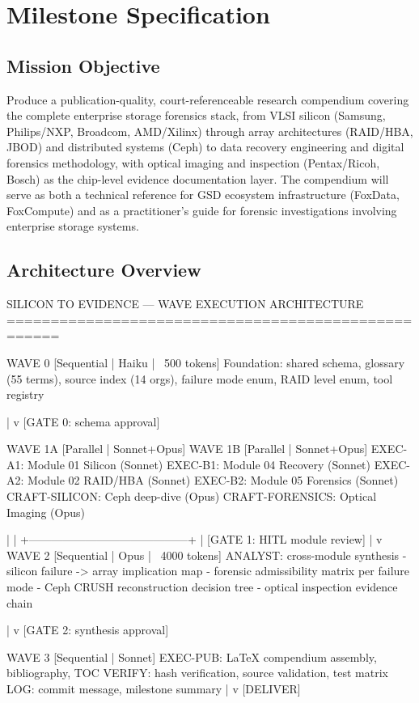 \documentclass[11pt,letterpaper]{article}
\begin{document}
\section{Milestone Specification}

\subsection{Mission Objective}

Produce a publication-quality, court-referenceable research compendium covering the complete enterprise storage forensics stack, from VLSI silicon (Samsung, Philips/NXP, Broadcom, AMD/Xilinx) through array architectures (RAID/HBA, JBOD) and distributed systems (Ceph) to data recovery engineering and digital forensics methodology, with optical imaging and inspection (Pentax/Ricoh, Bosch) as the chip-level evidence documentation layer. The compendium will serve as both a technical reference for GSD ecosystem infrastructure (FoxData, FoxCompute) and as a practitioner's guide for forensic investigations involving enterprise storage systems.

\subsection{Architecture Overview}

\begin{asciibox}
SILICON TO EVIDENCE --- WAVE EXECUTION ARCHITECTURE
====================================================

WAVE 0 [Sequential | Haiku | ~500 tokens]
  Foundation: shared schema, glossary (55 terms), source index (14 orgs),
  failure mode enum, RAID level enum, tool registry

  |
  v [GATE 0: schema approval]

WAVE 1A [Parallel | Sonnet+Opus]          WAVE 1B [Parallel | Sonnet+Opus]
  EXEC-A1: Module 01 Silicon (Sonnet)        EXEC-B1: Module 04 Recovery (Sonnet)
  EXEC-A2: Module 02 RAID/HBA (Sonnet)       EXEC-B2: Module 05 Forensics (Sonnet)
  CRAFT-SILICON: Ceph deep-dive (Opus)       CRAFT-FORENSICS: Optical Imaging (Opus)

  |                                          |
  +------------------------------------------+
                      |
              [GATE 1: HITL module review]
                      |
                      v
WAVE 2 [Sequential | Opus | ~4000 tokens]
  ANALYST: cross-module synthesis
    - silicon failure -> array implication map
    - forensic admissibility matrix per failure mode
    - Ceph CRUSH reconstruction decision tree
    - optical inspection evidence chain

  |
  v [GATE 2: synthesis approval]

WAVE 3 [Sequential | Sonnet]
  EXEC-PUB: LaTeX compendium assembly, bibliography, TOC
  VERIFY: hash verification, source validation, test matrix
  LOG: commit message, milestone summary
  |
  v [DELIVER]
\end{asciibox}
\end{document}
